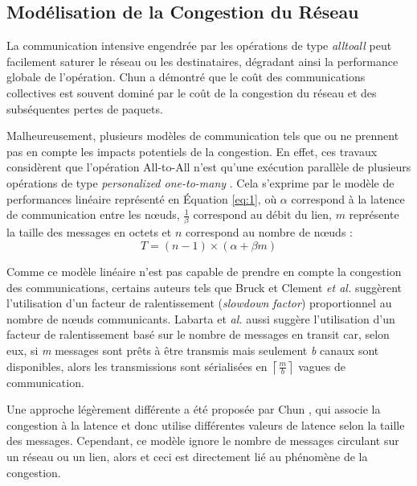 \subsection{Modélisation de la Congestion du Réseau\label{cluster}}

La communication intensive engendrée par les opérations de type \textit{alltoall} peut facilement saturer le réseau ou les destinataires, dégradant ainsi la performance globale de l'opération. Chun \cite{Chun01} a démontré que le coût des communications collectives est souvent dominé par le coût de la congestion du réseau et des subséquentes pertes de paquets.

Malheureusement, plusieurs modèles de communication tels que \cite{Christara99} ou \cite{Pjesivac-Grbovic05} ne prennent pas en compte les impacts potentiels de la congestion. En effet, ces travaux considèrent que l'opération All-to-All n'est qu'une exécution parallèle de plusieurs opérations de type \emph{personalized one-to-many} \cite{Johnsson89}. Cela s'exprime par le modèle de performances linéaire représenté en Équation \ref{eq:1}, où $\alpha$ correspond à la latence de communication entre les n{\oe}uds, $\frac{1}{\beta}$ correspond au débit du lien, $m$ représente la taille des messages en octets et  $n$ correspond au nombre de n{\oe}uds :
\begin{equation}
T=(n-1)\times(\alpha+\beta m)\label{eq:1}
\end{equation}

Comme ce modèle linéaire n'est pas capable de prendre en compte la congestion des communications, certains auteurs tels que Bruck \cite{Bruck97b} et Clement \emph{et al.} \cite{Clement96} suggèrent l'utilisation d'un facteur de ralentissement (\emph{slowdown factor}) proportionnel au nombre de n{\oe}uds communicants.  Labarta et \emph{al.} \cite{Labarta96} aussi suggère l'utilisation d'un facteur de ralentissement basé sur le nombre de messages en transit car, selon eux, si \emph{m} messages sont prêts à être transmis mais seulement \emph{b} canaux sont disponibles, alors les transmissions sont sérialisées en $\left\lceil \frac{m}{b}\right\rceil $ vagues de communication. 

Une approche légèrement différente a été proposée par Chun \cite{Chun01}, qui associe la congestion à la latence et donc utilise différentes valeurs de latence selon la taille des messages. Cependant, ce modèle ignore le nombre de messages circulant sur un réseau ou un lien, alors et ceci est directement lié au phénomène de la congestion. 

